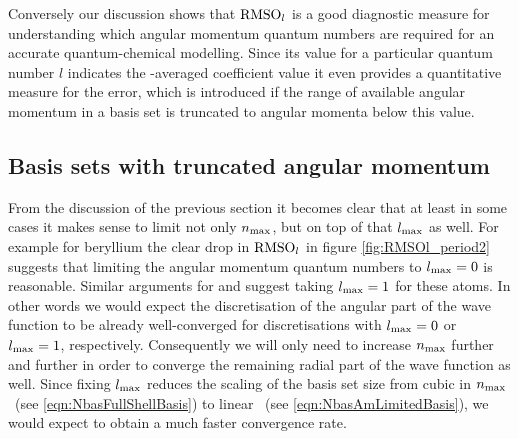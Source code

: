 %

Conversely our discussion shows that $\text{RMSO}_l$ is a good diagnostic measure
for understanding which angular momentum quantum numbers
are required for an accurate quantum-chemical modelling.
Since its value for a particular quantum number $l$ indicates
the \RMS-averaged coefficient value
it even provides a quantitative measure for the error,
which is introduced if the range of available angular momentum in a \CS basis set
is truncated to angular momenta below this value.

%
%

%
%
\subsection{Basis sets with truncated angular momentum}
From the discussion of the previous section
it becomes clear that at least in some cases it makes sense to
limit not only $n_\text{max}$, but on top of that $l_\text{max}$ as well.
For example for beryllium the clear drop in $\text{RMSO}_l$
in figure \ref{fig:RMSOl_period2} suggests that limiting the angular
momentum quantum numbers to $l_\text{max} = 0$ is reasonable.
Similar arguments for  and  suggest taking $l_\text{max} = 1$ for these atoms.
In other words we would expect the discretisation
of the angular part of the \HF wave function to be already well-converged
for \CS discretisations with $l_\text{max} = 0$ or $l_\text{max} = 1$, respectively.
Consequently we will only need to increase $n_\text{max}$ further and further
in order to converge the remaining radial part of the wave function as well.
Since fixing $l_\text{max}$ reduces the scaling of the basis set size
from cubic in $n_\text{max}$~(see \eqref{eqn:NbasFullShellBasis}) to linear%
~(see \eqref{eqn:NbasAmLimitedBasis}),
we would expect to obtain a much faster convergence rate.


